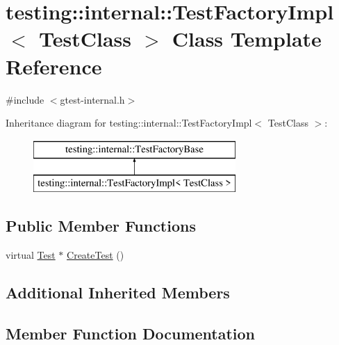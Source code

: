 \hypertarget{classtesting_1_1internal_1_1_test_factory_impl}{}\section{testing\+:\+:internal\+:\+:Test\+Factory\+Impl$<$ Test\+Class $>$ Class Template Reference}
\label{classtesting_1_1internal_1_1_test_factory_impl}


{\ttfamily \#include $<$gtest-\/internal.\+h$>$}

Inheritance diagram for testing\+:\+:internal\+:\+:Test\+Factory\+Impl$<$ Test\+Class $>$\+:\begin{figure}[H]
\begin{center}
\leavevmode
\includegraphics[height=2.000000cm]{classtesting_1_1internal_1_1_test_factory_impl}
\end{center}
\end{figure}
\subsection*{Public Member Functions}
\begin{DoxyCompactItemize}
\item 
virtual \hyperlink{classtesting_1_1_test}{Test} $\ast$ \hyperlink{classtesting_1_1internal_1_1_test_factory_impl_a8860c89bdb06450a5d5e8137ebd9d775}{Create\+Test} ()
\end{DoxyCompactItemize}
\subsection*{Additional Inherited Members}


\subsection{Member Function Documentation}
\hypertarget{classtesting_1_1internal_1_1_test_factory_impl_a8860c89bdb06450a5d5e8137ebd9d775}{}
